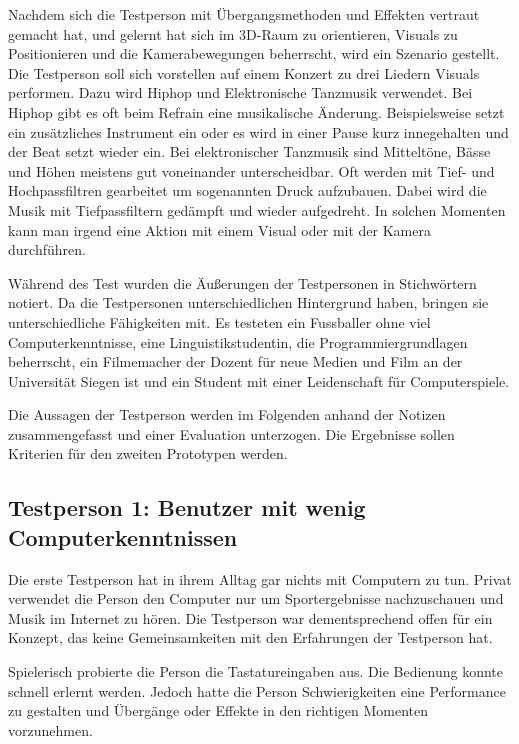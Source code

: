 Nachdem sich die Testperson mit \"Ubergangsmethoden und Effekten vertraut gemacht hat, und gelernt hat sich im 3D-Raum zu
orientieren, Visuals zu Positionieren und die Kamerabewegungen beherrscht, wird ein Szenario gestellt. Die Testperson soll 
sich vorstellen auf einem Konzert zu drei Liedern Visuals performen. Dazu wird Hiphop und Elektronische Tanzmusik 
verwendet. Bei Hiphop gibt es oft beim Refrain eine musikalische \"Anderung. Beispielsweise setzt ein zus\"atzliches 
Instrument ein oder es wird in einer Pause kurz innegehalten und der Beat setzt wieder ein. Bei elektronischer 
Tanzmusik sind Mittelt\"one, B\"asse und H\"ohen meistens gut voneinander unterscheidbar. Oft werden mit Tief- und
Hochpassfiltren gearbeitet um sogenannten Druck aufzubauen. Dabei wird die Musik mit Tiefpassfiltern ged\"ampft und wieder
aufgedreht. In solchen Momenten kann man irgend eine Aktion mit einem Visual oder mit der Kamera durchf\"uhren.

W\"ahrend des Test wurden die \"Au\ss{}erungen der Testpersonen in Stichw\"ortern notiert. Da die Testpersonen 
unterschiedlichen Hintergrund haben, bringen sie unterschiedliche F\"ahigkeiten mit. Es testeten ein Fussballer ohne viel
Computerkenntnisse, eine Linguistikstudentin, die Programmiergrundlagen beherrscht,
ein Filmemacher der Dozent f\"ur neue Medien und Film an der Universit\"at Siegen ist und ein Student
mit einer Leidenschaft f\"ur Computerspiele. 

Die Aussagen der Testperson werden im Folgenden anhand der Notizen zusammengefasst und einer Evaluation unterzogen. 
Die Ergebnisse sollen Kriterien f\"ur den zweiten Prototypen werden.

\subsection{Testperson 1: Benutzer mit wenig Computerkenntnissen}

Die erste Testperson hat in ihrem Alltag gar nichts mit Computern zu tun. Privat verwendet die Person den Computer nur um
Sportergebnisse nachzuschauen und Musik im Internet zu h\"oren. Die Testperson war dementsprechend offen f\"ur ein Konzept,
das keine Gemeinsamkeiten mit den Erfahrungen der Testperson hat. 

Spielerisch probierte die Person die Tastatureingaben aus.
Die Bedienung konnte schnell erlernt werden. Jedoch hatte die Person Schwierigkeiten eine Performance zu gestalten und
\"Uberg\"ange oder Effekte in den richtigen Momenten vorzunehmen.


